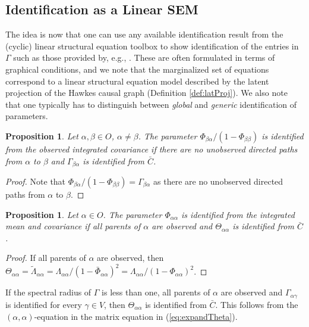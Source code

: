 \documentclass[accepted]{uai2021} %
\newtheorem{prop}[thm]{Proposition}
\begin{document}


\subsection{Identification as a Linear SEM}

The idea is now 
that one can use any available identification result from the (cyclic) linear 
structural equation toolbox to show identification of the entries in 
$\Gamma$ such as those provided by, e.g., \cite{foygelHalftrek2012, 
	chenNIPS2016, 
	weihs2018}. 
These are often 
formulated in terms of graphical 
conditions, and we note that the 
marginalized set of equations correspond to a linear structural 
equation model described by the latent projection of the Hawkes causal graph 
(Definition \ref{def:latProj}). We also note that one typically has to 
distinguish between \emph{global} and \emph{generic} identification of 
parameters.

\begin{prop}
	Let $\alpha,\beta \in O$, $\alpha\neq \beta$. The parameter 
	${\Phi}_{\beta\alpha}/(1-{\Phi}_{\beta\beta}) $ is 
	identified 
	from the observed integrated covariance if there 
	are no unobserved directed paths from 
	$\alpha$ to $\beta$ and $\Gamma_{\beta\alpha}$ is identified from 
	$\bar{C}$.
\end{prop}

\begin{proof}
	Note that ${\Phi}_{\beta\alpha}/(1-{\Phi}_{\beta\beta}) = 
	\Gamma_{\beta\alpha}$ as there 
	are no 
	unobserved directed paths from $\alpha$ to $\beta$.
\end{proof}

\begin{prop}
	Let $\alpha\in O$. The parameter $\Phi_{\alpha\alpha}$ is identified from 
	the 
	integrated mean and covariance if all 
	parents of $\alpha$ are observed and $\Theta_{\alpha\alpha}$ is identified 
	from 
	$\bar{C}$.
\end{prop}

\begin{proof}
	If all parents of $\alpha$ are observed, then $\Theta_{\alpha\alpha} = 
	\tilde{\Lambda}_{\alpha\alpha} = \Lambda_{\alpha\alpha}/(1 - 
	\bar{\Phi}_{\alpha\alpha})^2 = \Lambda_{\alpha\alpha}/(1 - 
	\Phi_{\alpha\alpha})^2$.
\end{proof}

If the spectral radius of $\Gamma$ is less than one, all parents of 
$\alpha$ are observed and $\Gamma_{\alpha\gamma}$ is 
identified for 
 every 
 $\gamma\in V$, then $\Theta_{\alpha\alpha}$ is identified from $\bar{C}$.
This follows from the $(\alpha,\alpha)$-equation in the matrix equation in 
(\ref{eq:expandTheta}).
\end{document}
